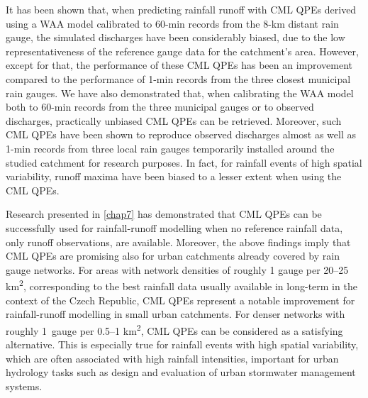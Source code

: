 \documentclass{ctuthesis}\usepackage[]{graphicx}\usepackage[]{color}
\begin{document}
It has been shown that, when predicting rainfall runoff with CML QPEs derived using a WAA model calibrated to 60-min records from the 8-km distant rain gauge, the simulated discharges have been considerably biased, due to the low representativeness of the reference gauge data for the catchment's area. However, except for that, the performance of these CML QPEs has been an improvement compared to the performance of 1-min records from the three closest municipal rain gauges. We have also demonstrated that, when calibrating the WAA model both to 60-min records from the three municipal gauges or to observed discharges, practically unbiased CML QPEs can be retrieved. Moreover, such CML QPEs have been shown to reproduce observed discharges almost as well as 1-min records from three local rain gauges temporarily installed around the studied catchment for research purposes. In fact, for rainfall events of high spatial variability, runoff maxima have been biased to a lesser extent when using the CML QPEs. 



\enlargethispage{\baselineskip}
Research presented in \ref{chap7} has demonstrated that CML QPEs can be successfully used for rainfall-runoff modelling when no reference rainfall data, only runoff observations, are available. Moreover, the above findings imply that CML QPEs are promising also for urban catchments already covered by rain gauge networks. For areas with network densities of roughly 1 gauge per 20--25 km\textsuperscript{2}, corresponding to the best rainfall data usually available in long-term in the context of the Czech Republic, CML QPEs represent a notable improvement for rainfall-runoff modelling in small urban catchments. For denser networks with roughly  1~gauge per 0.5--1 km\textsuperscript{2}, CML QPEs can be considered as a satisfying alternative. This is especially true for rainfall events with high spatial variability, which are often associated with high rainfall intensities, important for urban hydrology tasks such as design and evaluation of urban stormwater management systems. 


\end{document}

